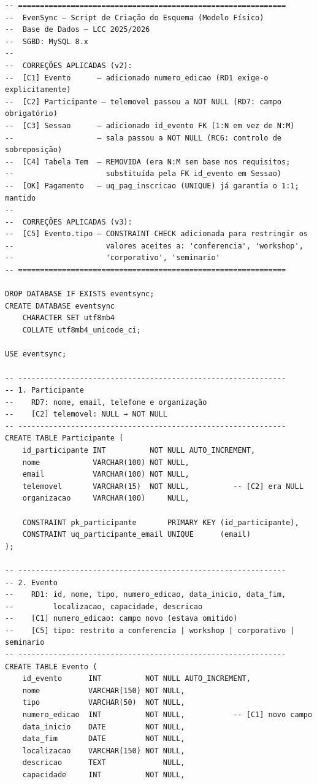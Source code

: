 \documentclass[runningheads]{llncs}
\begin{document}
\begin{small}
\begin{verbatim}
-- =============================================================
--  EvenSync — Script de Criação do Esquema (Modelo Físico)
--  Base de Dados — LCC 2025/2026
--  SGBD: MySQL 8.x
--
--  CORREÇÕES APLICADAS (v2):
--  [C1] Evento      — adicionado numero_edicao (RD1 exige-o explicitamente)
--  [C2] Participante — telemovel passou a NOT NULL (RD7: campo obrigatório)
--  [C3] Sessao      — adicionado id_evento FK (1:N em vez de N:M)
--                   — sala passou a NOT NULL (RC6: controlo de sobreposição)
--  [C4] Tabela Tem  — REMOVIDA (era N:M sem base nos requisitos;
--                     substituída pela FK id_evento em Sessao)
--  [OK] Pagamento   — uq_pag_inscricao (UNIQUE) já garantia o 1:1; mantido
--
--  CORREÇÕES APLICADAS (v3):
--  [C5] Evento.tipo — CONSTRAINT CHECK adicionada para restringir os
--                     valores aceites a: 'conferencia', 'workshop',
--                     'corporativo', 'seminario'
-- =============================================================

DROP DATABASE IF EXISTS eventsync;
CREATE DATABASE eventsync
    CHARACTER SET utf8mb4
    COLLATE utf8mb4_unicode_ci;

USE eventsync;

-- -------------------------------------------------------------
-- 1. Participante
--    RD7: nome, email, telefone e organização
--    [C2] telemovel: NULL → NOT NULL
-- -------------------------------------------------------------
CREATE TABLE Participante (
    id_participante INT          NOT NULL AUTO_INCREMENT,
    nome            VARCHAR(100) NOT NULL,
    email           VARCHAR(100) NOT NULL,
    telemovel       VARCHAR(15)  NOT NULL,          -- [C2] era NULL
    organizacao     VARCHAR(100)     NULL,

    CONSTRAINT pk_participante       PRIMARY KEY (id_participante),
    CONSTRAINT uq_participante_email UNIQUE      (email)
);

-- -------------------------------------------------------------
-- 2. Evento
--    RD1: id, nome, tipo, numero_edicao, data_inicio, data_fim,
--         localizacao, capacidade, descricao
--    [C1] numero_edicao: campo novo (estava omitido)
--    [C5] tipo: restrito a conferencia | workshop | corporativo | seminario
-- -------------------------------------------------------------
CREATE TABLE Evento (
    id_evento      INT          NOT NULL AUTO_INCREMENT,
    nome           VARCHAR(150) NOT NULL,
    tipo           VARCHAR(50)  NOT NULL,
    numero_edicao  INT          NOT NULL,           -- [C1] novo campo
    data_inicio    DATE         NOT NULL,
    data_fim       DATE         NOT NULL,
    localizacao    VARCHAR(150) NOT NULL,
    descricao      TEXT             NULL,
    capacidade     INT          NOT NULL,


\end{verbatim}
\end{small}
\end{document}
